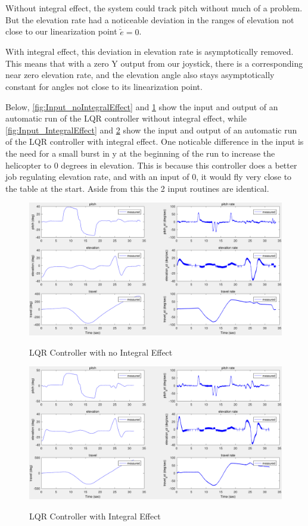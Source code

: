 Without integral effect, the system could track pitch without much of
a problem. But the elevation rate had a noticeable deviation in the
ranges of elevation not close to our linearization point
$\dot{\tilde{e}} = 0$.

With integral effect, this deviation in elevation rate is
asymptotically removed. This means that with a zero Y output from our
joystick, there is a corresponding near zero elevation rate, and the
elevation angle also stays asymptotically constant for angles not
close to its linearization point.

Below, \cref{fig:Input_noIntegralEffect} and \cref{fig:LQR_noEstimator} show the input and output of an automatic run of the LQR controller without integral effect, while \cref{fig:Input_IntegralEffect} and \cref{fig:LQRIntegralEffect_noEstimator} show the input and output of an automatic run of the LQR controller with integral effect. One noticable difference in the input is the need for a small burst in y at the beginning of the run to increase the helicopter to 0 degrees in elevation. This is because this controller does a better job regulating elevation rate, and with an input of 0, it would fly very close to the table at the start. Aside from this the 2 input routines are identical.

\begin{figure}[hbp]
\caption{LQR Controller with no Integral Effect}
	\centering
		\includegraphics[scale =0.4]{images/532_LQR_NoEstimator.pdf}
	\label{fig:LQR_noEstimator}
\end{figure}

\begin{figure}
\caption{LQR Controller with Integral Effect}
	\centering
		\includegraphics[scale =0.4]{images/533_LQRIntegralEffect_NoEstimator.pdf}
	\label{fig:LQRIntegralEffect_noEstimator}
\end{figure}

